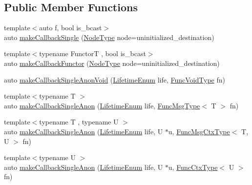 \subsection*{Public Member Functions}
\begin{DoxyCompactItemize}
\item 
{\footnotesize template$<$auto f, bool is\+\_\+bcast$>$ }\\auto \hyperlink{structvt_1_1pipe_1_1_pipe_manager_t_l_a2c6022b17f4e9181e3f214242756cd2a}{make\+Callback\+Single} (\hyperlink{namespacevt_a866da9d0efc19c0a1ce79e9e492f47e2}{Node\+Type} node=uninitialized\+\_\+destination)
\item 
{\footnotesize template$<$typename FunctorT , bool is\+\_\+bcast$>$ }\\auto \hyperlink{structvt_1_1pipe_1_1_pipe_manager_t_l_a72ef2f5094f971722a6e8aa1422f7869}{make\+Callback\+Functor} (\hyperlink{namespacevt_a866da9d0efc19c0a1ce79e9e492f47e2}{Node\+Type} node=uninitialized\+\_\+destination)
\item 
auto \hyperlink{structvt_1_1pipe_1_1_pipe_manager_t_l_ac22b018279b274ddc9a46b3abfc69a64}{make\+Callback\+Single\+Anon\+Void} (\hyperlink{namespacevt_1_1pipe_acb42b284378c0fdac1d7c6335dc26f58}{Lifetime\+Enum} life, \hyperlink{structvt_1_1pipe_1_1_pipe_manager_base_acd6f0c71f38f08d53f85e83b65406d77}{Func\+Void\+Type} fn)
\item 
{\footnotesize template$<$typename T $>$ }\\auto \hyperlink{structvt_1_1pipe_1_1_pipe_manager_t_l_a2eac310604186b69abfd9d55a9b77c0f}{make\+Callback\+Single\+Anon} (\hyperlink{namespacevt_1_1pipe_acb42b284378c0fdac1d7c6335dc26f58}{Lifetime\+Enum} life, \hyperlink{structvt_1_1pipe_1_1_pipe_manager_base_aa54eee64ab32a27777a672d49eb861f4}{Func\+Msg\+Type}$<$ T $>$ fn)
\item 
{\footnotesize template$<$typename T , typename U $>$ }\\auto \hyperlink{structvt_1_1pipe_1_1_pipe_manager_t_l_a99c60d656fee4e528ff61cacc2f89392}{make\+Callback\+Single\+Anon} (\hyperlink{namespacevt_1_1pipe_acb42b284378c0fdac1d7c6335dc26f58}{Lifetime\+Enum} life, U $\ast$u, \hyperlink{structvt_1_1pipe_1_1_pipe_manager_base_a73fdf82ece0411b3dc644c99b763f7a9}{Func\+Msg\+Ctx\+Type}$<$ T, U $>$ fn)
\item 
{\footnotesize template$<$typename U $>$ }\\auto \hyperlink{structvt_1_1pipe_1_1_pipe_manager_t_l_a07b4b67231348cb486b6c796152c27f2}{make\+Callback\+Single\+Anon} (\hyperlink{namespacevt_1_1pipe_acb42b284378c0fdac1d7c6335dc26f58}{Lifetime\+Enum} life, U $\ast$u, \hyperlink{structvt_1_1pipe_1_1_pipe_manager_base_ad8463823b6b4cfdb67c119d6d22e3bac}{Func\+Ctx\+Type}$<$ U $>$ fn)

\end{DoxyCompactItemize}

